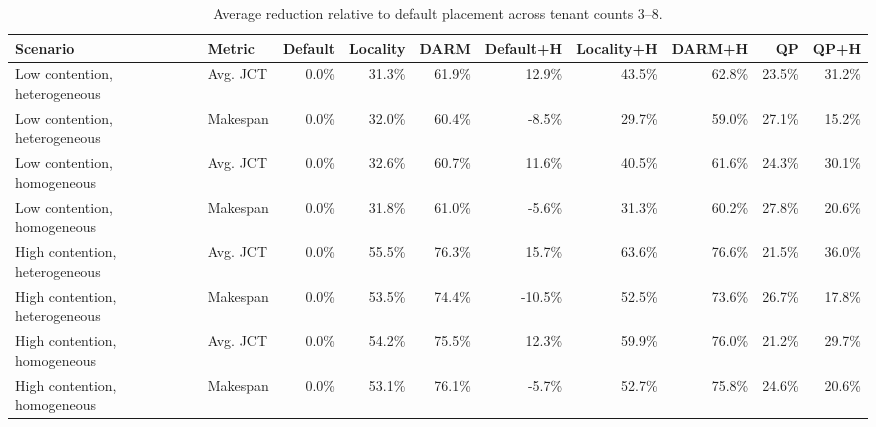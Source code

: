\begin{table}[t]
\centering
\caption{Average reduction relative to default placement across tenant counts 3--8.}
\label{tab:main-result-summary}
\begin{tabular}{llrrrrrrrr}
\toprule
Scenario & Metric & Default & Locality & DARM & Default+H & Locality+H & DARM+H & QP & QP+H \\
\midrule
Low contention, heterogeneous & Avg. JCT & 0.0\% & 31.3\% & 61.9\% & 12.9\% & 43.5\% & 62.8\% & 23.5\% & 31.2\% \\
Low contention, heterogeneous & Makespan & 0.0\% & 32.0\% & 60.4\% & -8.5\% & 29.7\% & 59.0\% & 27.1\% & 15.2\% \\
Low contention, homogeneous & Avg. JCT & 0.0\% & 32.6\% & 60.7\% & 11.6\% & 40.5\% & 61.6\% & 24.3\% & 30.1\% \\
Low contention, homogeneous & Makespan & 0.0\% & 31.8\% & 61.0\% & -5.6\% & 31.3\% & 60.2\% & 27.8\% & 20.6\% \\
High contention, heterogeneous & Avg. JCT & 0.0\% & 55.5\% & 76.3\% & 15.7\% & 63.6\% & 76.6\% & 21.5\% & 36.0\% \\
High contention, heterogeneous & Makespan & 0.0\% & 53.5\% & 74.4\% & -10.5\% & 52.5\% & 73.6\% & 26.7\% & 17.8\% \\
High contention, homogeneous & Avg. JCT & 0.0\% & 54.2\% & 75.5\% & 12.3\% & 59.9\% & 76.0\% & 21.2\% & 29.7\% \\
High contention, homogeneous & Makespan & 0.0\% & 53.1\% & 76.1\% & -5.7\% & 52.7\% & 75.8\% & 24.6\% & 20.6\% \\
\bottomrule
\end{tabular}
\end{table}

